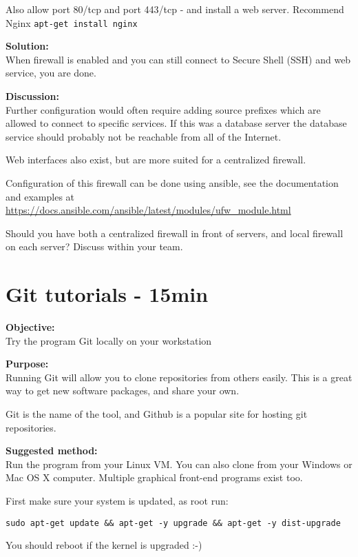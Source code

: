 \documentclass[a4paper,11pt,notitlepage]{report}
\begin{document}
Also allow port 80/tcp and port 443/tcp - and install a web server. Recommend Nginx \verb+apt-get install nginx+

{\bf Solution:}\\
When firewall is enabled and you can still connect to Secure Shell (SSH) and web service, you are done.

{\bf Discussion:}\\
Further configuration would often require adding source prefixes which are allowed to connect to specific services. If this was a database server the database service should probably not be reachable from all of the Internet.

Web interfaces also exist, but are more suited for a centralized firewall.

Configuration of this firewall can be done using ansible, see the documentation and examples at \url{https://docs.ansible.com/ansible/latest/modules/ufw_module.html}

Should you have both a centralized firewall in front of servers, and local firewall on each server? Discuss within your team.


\chapter{Git tutorials - 15min}
\label{ex:git-tutorial}



{\bf Objective:}\\
Try the program Git locally on your workstation

{\bf Purpose:}\\
Running Git will allow you to clone repositories from others easily. This is a great way to get new software packages, and share your own.

Git is the name of the tool, and Github is a popular site for hosting git repositories.

{\bf Suggested method:}\\
Run the program from your Linux VM. You can also clone from your Windows or Mac OS X computer. Multiple graphical front-end programs exist too.


First make sure your system is updated, as root run:

\begin{verbatim}
sudo apt-get update && apt-get -y upgrade && apt-get -y dist-upgrade
\end{verbatim}
You should reboot if the kernel is upgraded :-)
\end{document}
